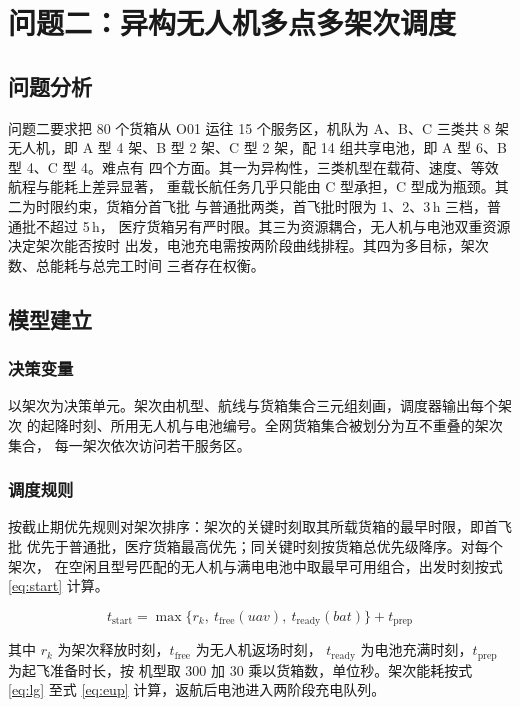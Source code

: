 \section{问题二：异构无人机多点多架次调度}
\label{sec:p2}

\subsection{问题分析}

问题二要求把 80 个货箱从 O01 运往 15 个服务区，机队为 A、B、C 三类共 8 架
无人机，即 A 型 4 架、B 型 2 架、C 型 2 架，配 14 组共享电池，即 A 型 6、B 型 4、C 型 4。难点有
四个方面。其一为异构性，三类机型在载荷、速度、等效航程与能耗上差异显著，
重载长航任务几乎只能由 C 型承担，C 型成为瓶颈。其二为时限约束，货箱分首飞批
与普通批两类，首飞批时限为 1、2、3\,h 三档，普通批不超过 5\,h，
医疗货箱另有严时限。其三为资源耦合，无人机与电池双重资源决定架次能否按时
出发，电池充电需按两阶段曲线排程。其四为多目标，架次数、总能耗与总完工时间
三者存在权衡。

\subsection{模型建立}

\subsubsection{决策变量}

以架次为决策单元。架次由机型、航线与货箱集合三元组刻画，调度器输出每个架次
的起降时刻、所用无人机与电池编号。全网货箱集合被划分为互不重叠的架次集合，
每一架次依次访问若干服务区。

\subsubsection{调度规则}

按截止期优先规则对架次排序：架次的关键时刻取其所载货箱的最早时限，即首飞批
优先于普通批，医疗货箱最高优先；同关键时刻按货箱总优先级降序。对每个架次，
在空闲且型号匹配的无人机与满电电池中取最早可用组合，出发时刻按式
\eqref{eq:start} 计算。

\begin{equation}
t_{\mathrm{start}}=\max\{r_k,\ t_{\mathrm{free}}(uav),\ t_{\mathrm{ready}}(bat)\}
+ t_{\mathrm{prep}}
\label{eq:start}
\end{equation}

其中 $r_k$ 为架次释放时刻，$t_{\mathrm{free}}$ 为无人机返场时刻，
$t_{\mathrm{ready}}$ 为电池充满时刻，$t_{\mathrm{prep}}$ 为起飞准备时长，按
机型取 300 加 30 乘以货箱数，单位秒。架次能耗按式 \eqref{eq:lg} 至式
\eqref{eq:eup} 计算，返航后电池进入两阶段充电队列。

